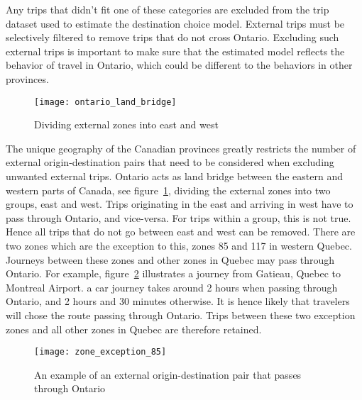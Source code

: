 Any trips that didn't fit one of these categories are excluded from the trip dataset used to estimate the destination choice model. External trips must be selectively filtered to remove trips that do not cross Ontario. Excluding such external trips is important to make sure that the estimated model reflects the behavior of travel in Ontario, which could be different to the behaviors in other provinces. 

\begin{figure}[H]
\centering
\texttt{[image: ontario\_land\_bridge]}
\caption{Dividing external zones into east and west}
\label{fig:bridge}
\end{figure}

The unique geography of the Canadian provinces greatly restricts the number of external origin-destination pairs that need to be considered when excluding unwanted external trips. Ontario acts as land bridge between the eastern and western parts of Canada, see figure~\ref{fig:bridge}, dividing the external zones into two groups, east and west. Trips originating in the east and arriving in west have to pass through Ontario, and vice-versa. For trips within a group, this is not true. Hence all trips that do not go between east and west can be removed. There are two zones which are the exception to this, zones 85 and 117 in western Quebec. Journeys between these zones and other zones in Quebec may pass through Ontario. For example, figure~\ref{fig:exception85} illustrates a journey from Gatieau, Quebec to Montreal Airport. a car journey takes around 2 hours when passing through Ontario, and 2 hours and 30 minutes otherwise. It is hence likely that travelers will chose the route passing through Ontario. Trips between these two exception zones and all other zones in Quebec are therefore retained. 

\begin{figure}[H]
\centering
\texttt{[image: zone\_exception\_85]}
\caption{An example of an external origin-destination pair that passes through Ontario}
\label{fig:exception85}
\end{figure}

\begin{comment}
Figure~\ref{fig:distance} illustrates how the distance distribution of the estimated trips fits the observed distribution much better after undesired external trips are removed. In total 69,328 individual trip records remain from the TSRC dataset for model estimation, representing 40,177,841 weighted trips.

\begin{figure}[H]
\centering
\texttt{[image: est\_vs\_obs\_distance]}
\caption{Estimated vs. observed trip distance}
\label{fig:distance}
\end{figure}

\end{comment}

